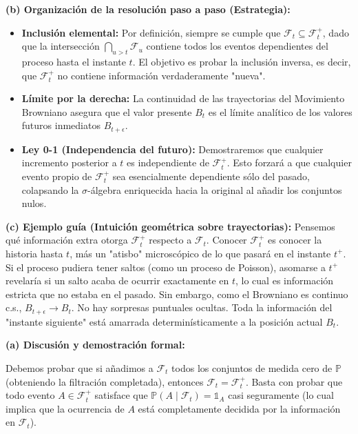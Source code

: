 \documentclass[11pt, letterpaper]{article}
\begin{document}
\begin{solucion}
    \textbf{(b) Organización de la resolución paso a paso (Estrategia):}
    \begin{itemize}
        \item[(i)] \textbf{Inclusión elemental:} Por definición, siempre se cumple que $\mathcal{F}_t \subseteq \mathcal{F}_t^+$, dado que la intersección $\bigcap_{u>t} \mathcal{F}_u$ contiene todos los eventos dependientes del proceso hasta el instante $t$. El objetivo es probar la inclusión inversa, es decir, que $\mathcal{F}_t^+$ no contiene información verdaderamente "nueva".
        \item[(ii)] \textbf{Límite por la derecha:} La continuidad de las trayectorias del Movimiento Browniano asegura que el valor presente $B_t$ es el límite analítico de los valores futuros inmediatos $B_{t+\epsilon}$.
        \item[(iii)] \textbf{Ley 0-1 (Independencia del futuro):} Demostraremos que cualquier incremento posterior a $t$ es independiente de $\mathcal{F}_t^+$. Esto forzará a que cualquier evento propio de $\mathcal{F}_t^+$ sea esencialmente dependiente sólo del pasado, colapsando la $\sigma$-álgebra enriquecida hacia la original al añadir los conjuntos nulos.
    \end{itemize}

    \vspace{3mm}
    \textbf{(c) Ejemplo guía (Intuición geométrica sobre trayectorias):}
    Pensemos qué información extra otorga $\mathcal{F}_t^+$ respecto a $\mathcal{F}_t$. Conocer $\mathcal{F}_t^+$ es conocer la historia hasta $t$, más un "atisbo" microscópico de lo que pasará en el instante $t^+$. Si el proceso pudiera tener saltos (como un proceso de Poisson), asomarse a $t^+$ revelaría si un salto acaba de ocurrir exactamente en $t$, lo cual es información estricta que no estaba en el pasado. Sin embargo, como el Browniano es continuo c.s., $B_{t+\epsilon} \to B_t$. No hay sorpresas puntuales ocultas. Toda la información del "instante siguiente" está amarrada determinísticamente a la posición actual $B_t$.

    \vspace{3mm}
    \textbf{(a) Discusión y demostración formal:}

    Debemos probar que si añadimos a $\mathcal{F}_t$ todos los conjuntos de medida cero de $\mathbb{P}$ (obteniendo la filtración completada), entonces $\mathcal{F}_t = \mathcal{F}_t^+$.
    Basta con probar que todo evento $A \in \mathcal{F}_t^+$ satisface que $\mathbb{P}(A \mid \mathcal{F}_t) = \mathbb{1}_A$ casi seguramente (lo cual implica que la ocurrencia de $A$ está completamente decidida por la información en $\mathcal{F}_t$).


\end{solucion}
\end{document}
